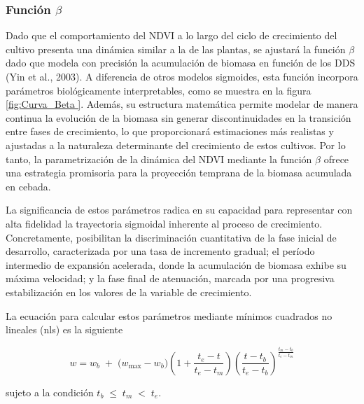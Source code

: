 \documentclass[
11pt, %
]{charter}
\begin{document}
\subsubsection{Función $\beta$}
\label{sec:descripcion}

Dado que el comportamiento del NDVI a lo largo del ciclo de crecimiento del cultivo presenta una dinámica similar a la de las plantas, se ajustará la función $\beta$ dado que modela con precisión la acumulación de biomasa en función de los DDS (Yin et al., 2003). A diferencia de otros modelos sigmoides, esta función incorpora parámetros biológicamente interpretables, como se muestra en la figura \ref{fig:Curva_Beta }. Además, su estructura matemática permite modelar de manera continua la evolución de la biomasa sin generar discontinuidades en la transición entre fases de crecimiento, lo que proporcionará estimaciones más realistas y ajustadas a la naturaleza determinante del crecimiento de estos cultivos. Por lo tanto, la parametrización de la dinámica del NDVI mediante la función $\beta$ ofrece una estrategia promisoria para la proyección temprana de la biomasa acumulada en cebada.

La significancia de estos parámetros radica en su capacidad para representar con alta fidelidad la trayectoria sigmoidal inherente al proceso de crecimiento. Concretamente, posibilitan la discriminación cuantitativa de la fase inicial de desarrollo, caracterizada por una tasa de incremento gradual; el período intermedio de expansión acelerada, donde la acumulación de biomasa exhibe su máxima velocidad; y la fase final de atenuación, marcada por una progresiva estabilización en los valores de la variable de crecimiento. 

La ecuación para calcular estos parámetros mediante mínimos cuadrados no lineales (nls) es la siguiente

\begin{equation}
\label{eq:betaGrowth}
w = w_b \;+\; \bigl(w_{\max} - w_b\bigr) 
        \left(1 + \frac{t_e - t}{t_e - t_m}\right)
        \left(\frac{t - t_b}{t_e - t_b}\right)^{\!\frac{t_m - t_b}{t_e - t_m}}
\end{equation}

sujeto a la condición \(t_b \;\leq\; t_m \;<\; t_e\).
\end{document}
